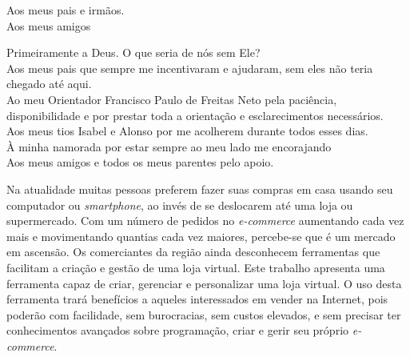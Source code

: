 \documentclass[a4paper,12pt]{monografia}
\begin{document}
%
  
%
\tecnologo {} 
%
 
\unidadeacademica{}
%
%

\maketitle
\begin{dedicatoria}
Aos meus pais e irmãos.\\
Aos meus amigos\\
\end{dedicatoria}

\noindent Primeiramente a Deus. O que seria de nós sem Ele?	\\
Aos meus pais que sempre me incentivaram e ajudaram, sem eles não teria chegado até aqui.\\
Ao meu Orientador Francisco Paulo de Freitas Neto pela paciência, disponibilidade e por prestar toda a orientação e esclarecimentos necessários.\\
Aos meus tios Isabel e Alonso por me acolherem durante todos esses dias.\\
À minha namorada por estar sempre ao meu lado me encorajando\\
Aos meus amigos e todos os meus parentes pelo apoio.

\newpage


Na atualidade muitas pessoas preferem fazer suas compras em casa usando seu computador ou \textit{smartphone}, ao invés de se deslocarem até uma loja ou supermercado. Com um número de pedidos no \textit{e-commerce} aumentando cada vez mais e movimentando quantias cada vez maiores, percebe-se que é um mercado em ascensão. Os comerciantes da região ainda desconhecem ferramentas que facilitam a criação e gestão de uma loja virtual. Este trabalho apresenta uma ferramenta capaz de criar, gerenciar e personalizar uma loja virtual. O uso desta ferramenta trará benefícios a aqueles interessados em vender na Internet, pois poderão com facilidade, sem burocracias, sem custos elevados, e sem precisar ter conhecimentos avançados sobre programação, criar e gerir seu próprio \textit{e-commerce}.
\end{document}
